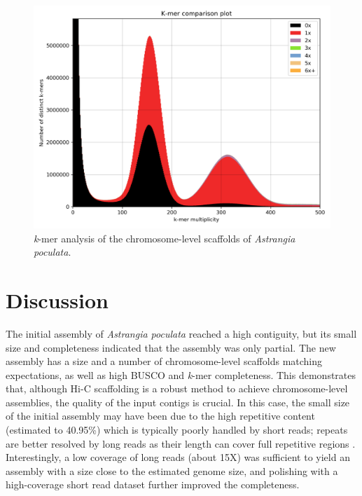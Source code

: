 \begin{figure}[H]
    \centering
    \includegraphics[width=0.9\linewidth]{fig/coral_kat.png}
    \caption{\textit{k}-mer analysis of the chromosome-level scaffolds of \textit{Astrangia poculata}. }
    \label{fig:coral_kat}
\end{figure}

\section{Discussion}

The initial assembly of \textit{Astrangia poculata} reached a high contiguity, but its small size and completeness indicated that the assembly was only partial. The new assembly has a size and a number of chromosome-level scaffolds matching expectations, as well as high BUSCO and \textit{k}-mer completeness. This demonstrates that, although Hi-C scaffolding is a robust method to achieve chromosome-level assemblies, the quality of the input contigs is crucial. In this case, the small size of the initial assembly may have been due to the high repetitive content (estimated to 40.95\%) which is typically poorly handled by short reads; repeats are better resolved by long reads as their length can cover full repetitive regions \cite{pollard2018}. Interestingly, a low coverage of long reads (about 15X) was sufficient to yield an assembly with a size close to the estimated genome size, and polishing with a high-coverage short read dataset further improved the completeness. \\

